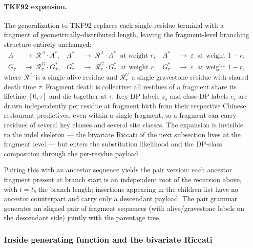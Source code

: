 \paragraph{TKF92 expansion.} The generalization to TKF92 replaces
each single-residue terminal with a fragment of geometrically-distributed
length, leaving the fragment-level branching structure entirely
unchanged:
\begin{align*}
A &\;\to\; \mathcal{R}^A \cdot A^*,
& A^* &\;\to\; \mathcal{R}^A \cdot A^* \;\;\text{at weight } r,
& A^* &\;\to\; \varepsilon \;\;\text{at weight } 1 - r, \\
G_\tau &\;\to\; \mathcal{R}^G_\tau \cdot G_\tau^*,
& G_\tau^* &\;\to\; \mathcal{R}^G_\tau \cdot G_\tau^* \;\;\text{at weight } r,
& G_\tau^* &\;\to\; \varepsilon \;\;\text{at weight } 1 - r,
\end{align*}
where $\mathcal{R}^A$ is a single alive residue and
$\mathcal{R}^G_\tau$ a single gravestone residue with shared death
time $\tau$. Fragment death is collective: all residues of a
fragment share its lifetime $[0, \tau]$ and die together at $\tau$.
Key-DP labels $z_s$ and class-DP labels $c_s$ are drawn
independently per residue at fragment birth from their respective
Chinese restaurant predictives, even within a single fragment, so a
fragment can carry residues of several key classes and several site
classes. The expansion is invisible to the indel skeleton --- the
bivariate Riccati of the next subsection lives at the fragment level
--- but enters the substitution likelihood and the DP-class
composition through the per-residue payload.

Pairing this with an ancestor sequence yields the pair version: each
ancestor fragment present at branch start is an independent root of
the recursion above, with $t = t_b$ the branch length; insertions
appearing in the children list have no ancestor counterpart and
carry only a descendant payload. The pair grammar generates an
aligned pair of fragment sequences (with alive/gravestone labels on
the descendant side) jointly with the parentage tree.

\subsubsection*{Inside generating function and the bivariate Riccati}

